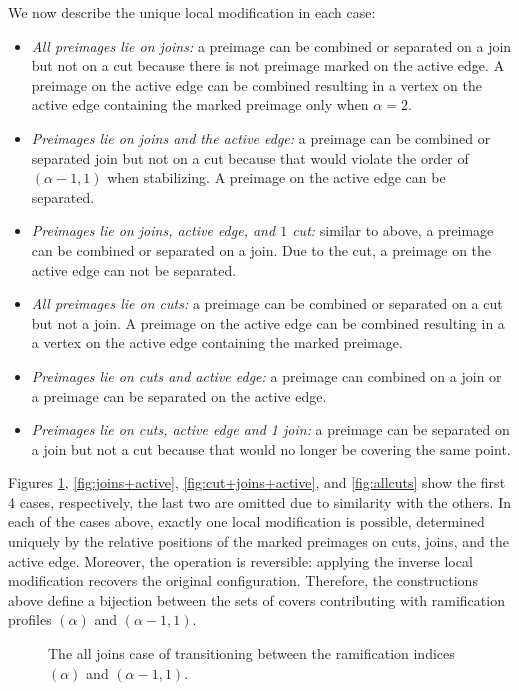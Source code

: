 \documentclass[11pt,reqno]{amsart}
\newcommand{\inputTikZ}[2]{%
     \resizebox{#1}{!}{}}
\theoremstyle{definition}
\begin{document}
We now describe the unique local modification in each case:
\begin{itemize}
    \item \emph{All preimages lie on joins:} a preimage can be combined or separated on a join but not on a cut because there is not preimage marked on the active edge. A preimage on the active edge can be combined resulting in a vertex on the active edge containing the marked preimage only when $\alpha=2$.
    \item \emph{Preimages lie on joins and the active edge:} a preimage can be combined or separated join but not on a cut because that would violate the order of $(\alpha-1,1)$ when stabilizing. A preimage on the active edge can be separated. 
    \item \emph{Preimages lie on joins, active edge, and $1$ cut:} similar to above, a preimage can be combined or separated on a join. Due to the cut, a preimage on the active edge can not be separated. 
    \item \emph{All preimages lie on cuts:} a preimage can be combined or separated on a cut but not a join. A preimage on the active edge can be combined resulting in a a vertex on the active edge containing the marked preimage.
    \item \emph{Preimages lie on cuts and active edge:} a preimage can combined on a join or a preimage can be separated on the active edge. 
    \item \emph{Preimages lie on cuts, active edge and 1 join:} a preimage can be separated on a join but not a cut because that would no longer be covering the same point.
\end{itemize}
Figures \ref{fig:alljoins}, \ref{fig:joins+active}, \ref{fig:cut+joins+active}, and  \ref{fig:allcuts} show the first 4 cases, respectively, the last two are omitted due to similarity with the others. In each of the cases above, exactly one local modification is possible, determined uniquely by the
relative positions of the marked preimages on cuts, joins, and the active edge. Moreover,
the operation is reversible: applying the inverse local modification recovers the original
configuration. Therefore, the constructions above define a bijection between the sets of
covers contributing with ramification profiles $(\alpha)$ and $(\alpha-1,1)$.


\begin{figure}
    \centering
    \inputTikZ{.8\textwidth}{Figures/alljoins}
    \caption{The all joins case of transitioning between the ramification indices $(\alpha)$ and $(\alpha-1,1)$.}
    \label{fig:alljoins}
\end{figure}
\end{document}
